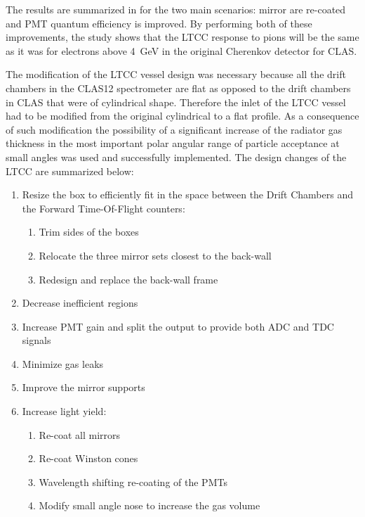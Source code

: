 The results are summarized in  for the two main scenarios: mirror are re-coated and PMT quantum
efficiency is improved. By performing both of these improvements, the study shows that the LTCC response to pions
will be the same as it was for electrons above 4~GeV in the original Cherenkov detector for CLAS.

The modification of the LTCC vessel design was necessary because all the drift chambers in the CLAS12 spectrometer
are flat as opposed to the drift chambers in CLAS that were of cylindrical shape. Therefore the inlet
of the LTCC vessel had to be modified from the original cylindrical to a flat profile. As a consequence of such
modification the possibility of a significant increase of the radiator gas thickness in the most important
polar angular range of particle acceptance at small angles was used and successfully implemented.
The design changes of the LTCC are summarized below:

\begin{enumerate}
    \item Resize the box to efficiently fit in the space between the Drift Chambers and the Forward Time-Of-Flight counters:
	\begin{enumerate}
		\item Trim sides of the boxes
		\item Relocate the three mirror sets closest to the back-wall
		\item Redesign and replace the back-wall frame
	\end{enumerate}

	\item Decrease inefficient regions
	\item Increase PMT gain and split the output to provide both ADC and TDC signals
	\item Minimize gas leaks
	\item Improve the mirror supports
	\item Increase light yield:
	\begin{enumerate}
		\item Re-coat all mirrors
		\item Re-coat Winston cones
		\item Wavelength shifting re-coating of the PMTs
		\item Modify small angle nose to increase the gas volume
	\end{enumerate}
\end{enumerate}








